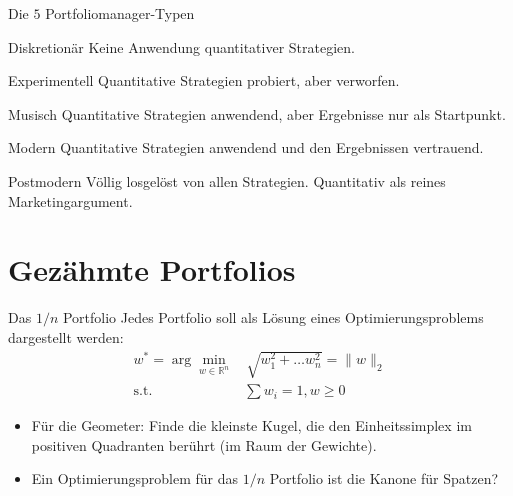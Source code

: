 \documentclass[10pt]{beamer}
\newcommand{\R}{\mathbb R}
\providecommand{\norm}[1]{\lVert#1\rVert}
\begin{document}
\begin{frame}{Die $5$ Portfoliomanager-Typen}
      \begin{alertblock}{Diskretionär}
        Keine Anwendung quantitativer Strategien.
      \end{alertblock}
      
      \begin{alertblock}{Experimentell}
       Quantitative Strategien probiert, aber verworfen.
      \end{alertblock}
      
      \begin{alertblock}{Musisch}
        Quantitative Strategien anwendend, aber Ergebnisse nur als Startpunkt.
      \end{alertblock}
      
      \begin{alertblock}{Modern}
        Quantitative Strategien anwendend und den Ergebnissen vertrauend.
      \end{alertblock}
      
      \begin{alertblock}{Postmodern}
        Völlig losgelöst von allen Strategien. Quantitativ als reines Marketingargument.
      \end{alertblock}
\end{frame}


\section{Gezähmte Portfolios}

\begin{frame}{Das $1/n$ Portfolio}
Jedes Portfolio soll als Lösung eines Optimierungsproblems dargestellt werden:
\begin{align}
w^*=\arg\min_{w\in\R^n}&\,\sqrt{w_1^2  + \ldots w_n^2} = \norm{w}_2 \\
\text{s.t. }&\sum w_i = 1, w\geq 0\nonumber
\end{align}
\begin{itemize}
\item Für die Geometer: Finde die kleinste Kugel, die den Einheitssimplex im positiven Quadranten berührt (im Raum der Gewichte).
\item Ein Optimierungsproblem für das $1/n$ Portfolio ist die Kanone für Spatzen? 
\end{itemize}
\end{frame}
\end{document}

